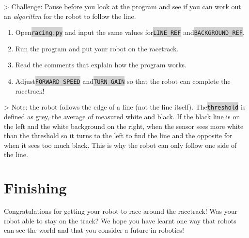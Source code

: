 \documentclass[12pt,a4paper]{article}
\newcommand{\code}[1]{\colorbox{lightgray}{\texttt{#1}}}
\begin{document}
> Challenge: Pause before you look at the program and see if you can work out an \emph{algorithm} for the robot to follow the line.

\begin{enumerate}
\item Open\code{racing.py} and input the same values for\code{LINE\_REF} and\code{BACKGROUND\_REF}. 
\item Run the program and put your robot on the racetrack. 
\item Read the comments that explain how the program works. 
\item Adjust\code{FORWARD\_SPEED} and\code{TURN\_GAIN} so that the robot can complete the racetrack! 
\end{enumerate}

> Note: the robot follows the edge of a line (not the line itself). The\code{threshold} is defined as grey, the average of measured white and black. If the black line is on the left and the white background on the right, when the sensor sees more white than the threshold so it turns to the left to find the line and the opposite for when it sees too much black. This is why the robot can only follow one side of the line.

\section{ Finishing}
Congratulations for getting your robot to race around the racetrack! Was your robot able to stay on the track? We hope you have learnt one way that robots can see the world and that you consider a future in robotics!
\end{document}
